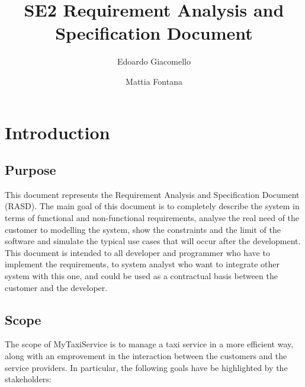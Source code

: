 \documentclass[11pt, a4paper,titlepage]{article}
\author{Edoardo Giacomello \and Mattia Fontana}
\title{SE2 Requirement Analysis and Specification Document} %
\newcommand{\productname}{MyTaxiService }
\begin{document}
\maketitle
\tableofcontents
\newpage
\section{Introduction}
\subsection{Purpose} This document represents the Requirement Analysis and Specification Document (RASD). The main goal of this document is to completely describe the system in terms of functional and non-functional requirements, analyse the real need of the customer to modelling the system, show the constraints and the limit of the software and simulate the typical use cases that will occur after the development. This document is intended to all developer and programmer who have to implement the requirements, to system analyst who want to integrate other system with this one, and could be used as a contractual basis between the customer and the developer.
\subsection{Scope}
The scope of \productname is to manage a taxi service in a more efficient way, along with an emprovement in the interaction between the customers and the service providers. 
\newline In particular, the following goals have be highlighted by the stakeholders:
\end{document}
